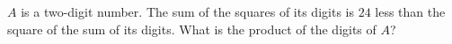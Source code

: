 $A$ is a two-digit number. The sum of the squares of its digits is $24$ less than the square of the sum of its digits. What is the product of the digits of $A$?
